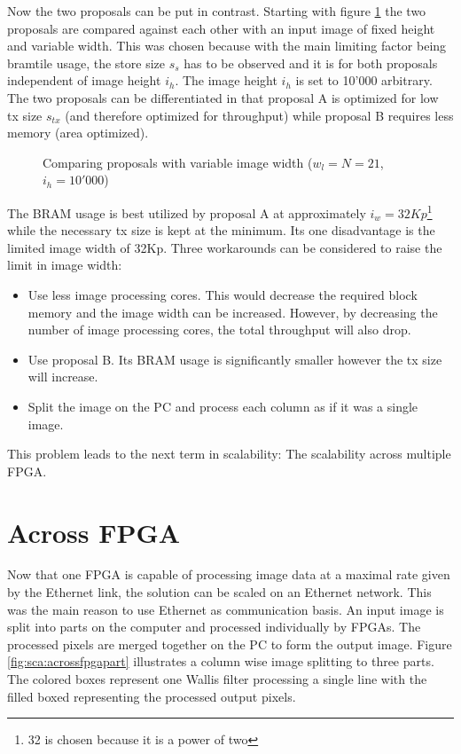 \pagebreak

Now the two proposals can be put in contrast. Starting with figure 
\ref{fig:sca:compfixheight} the two proposals are compared against each other
with an input image of fixed height and variable width. This was chosen because
with the main limiting factor being \gls{bramtile} usage, the store size $s_s$ has to
be observed and it is for both proposals independent of image height $i_h$.
The image height $i_h$ is set to 10'000 arbitrary. The
two proposals can be differentiated in that proposal A is optimized for low tx
size $s_{tx}$ (and therefore optimized for throughput) while proposal B requires
less memory (area optimized). 

\begin{figure}[b!]
    \centering
    \begin{adjustbox}{max width=\linewidth}
        
    \end{adjustbox}
    \caption{Comparing proposals with variable image width ($w_l=N=21$,
    $i_h=10'000$)}
    \label{fig:sca:compfixheight}
\end{figure}

\pagebreak
The BRAM usage is best utilized by proposal A at approximately
$i_w=32Kp$\footnote{32 is chosen because it is a power of two} while
the necessary tx size is kept at the minimum. Its one disadvantage is the
limited image width of 32Kp. Three workarounds can be considered to raise the
limit in image width:
\begin{itemize}
    \item Use less image processing cores. This would decrease the required
    block memory and the image width can be increased. However, by decreasing the
    number of image processing cores, the total throughput will also drop.
    \item Use proposal B. Its BRAM usage is significantly smaller however the tx
    size will increase.
    \item Split the image on the PC and process each column as if it was a
    single image.
\end{itemize}

This problem leads to the next term in scalability: The scalability across
multiple FPGA.


\section{Across FPGA}
Now that one FPGA is capable of processing image data at a maximal rate given
by the Ethernet link, the solution can be scaled on an Ethernet network. This
was the main reason to use Ethernet as communication basis. An input image is
split into parts on the computer and processed individually by FPGAs. The
processed pixels are merged together on the PC to form the output image. Figure
\ref{fig:sca:acrossfpgapart} illustrates a column wise image splitting to three
parts. The colored boxes represent one Wallis filter processing a single line
with the filled boxed representing the processed output pixels.

